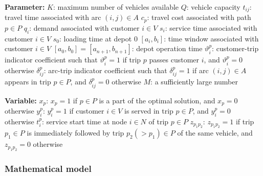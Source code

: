 \noindent
\textbf{Parameter:}
\newline
$K$: maximum number of vehicles available
\newline
$Q$: vehicle capacity
\newline
$t_{ij}$: travel time associated with arc $(i, j) \in A$
\newline
$c_p$: travel cost associated with path $p \in P$
\newline
$q_i$: demand associated with customer $i \in V$
\newline
$s_i$: service time associated with customer $i \in V$
\newline
$s_0$: loading time at depot $0$
\newline
$[a_i, b_i]$: time window associated with customer $i \in V$
\newline
$[a_0, b_0] = [a_{n + 1}, b_{n + 1}]$: depot operation time
\newline
$\vartheta^p_i$: customer-trip indicator coefficient such that $\vartheta^p_i = 1$ if trip $p$ passes customer $i$, and $\vartheta^p_i = 0$ otherwise
\newline
$\delta^p_{ij}$: arc-trip indicator coefficient such that $\delta^p_{ij} = 1$ if arc $(i, j) \in A$ appears in trip $p \in P$, and $\delta^p_{ij} = 0$ otherwise
\newline
$M$: a sufficiently large number
\newline

\noindent
\textbf{Variable:}
\newline
$x_p$: $x_p = 1$ if $p \in P$ is a part of the optimal solution, and $x_p = 0$ otherwise
\newline
$y^p_i$: $y^p_i = 1$ if customer $i \in V$ is served in trip $p \in P$, and $y^p_i = 0$ otherwise
\newline
$t^p_i$: service start time at node $i \in N$ of trip $p \in P$
\newline
$z_{{p_1}{p_2}}$: $z_{{p_1}{p_2}} = 1$ if trip $p_1 \in P$ is immediately followed by trip $p_2 (> p_1) \in P$ of the same vehicle, and $z_{{p_1}{p_2}} = 0$ otherwise

\subsubsection{Mathematical model}

